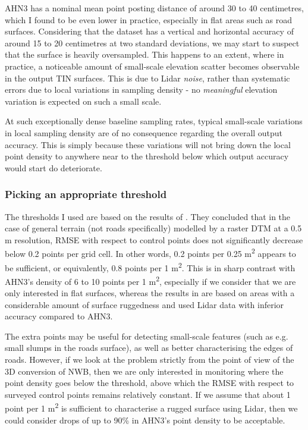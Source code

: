 AHN3 has a nominal mean point posting distance of around 30 to 40 centimetres, which I found to be even lower in practice, especially in flat areas such as road surfaces. Considering that the dataset has a vertical and horizontal accuracy of around 15 to 20 centimetres at two standard deviations, we may start to suspect that the surface is heavily oversampled. This happens to an extent, where in practice, a noticeable amount of small-scale elevation scatter becomes observable in the output TIN surfaces. This is due to Lidar \textit{noise}, rather than systematic errors due to local variations in sampling density - no \textit{meaningful} elevation variation is expected on such a small scale.

At such exceptionally dense baseline sampling rates, typical small-scale variations in local sampling density are of no consequence regarding the overall output accuracy. This is simply because these variations will not bring down the local point density to anywhere near to the threshold below which output accuracy would start do deteriorate. 

\subsubsection{Picking an appropriate threshold}

The thresholds I used are based on the results of \cite{guo_etal_2010}. They concluded that in the case of general terrain (not roads specifically) modelled by a raster DTM at a 0.5 m resolution, RMSE with respect to control points does not significantly decrease below 0.2 points per grid cell. In other words, 0.2 points per 0.25 m\textsuperscript{2} appears to be sufficient, or equivalently, 0.8 points per 1 m\textsuperscript{2}. This is in sharp contrast with AHN3's density of 6 to 10 points per 1 m\textsuperscript{2}, especially if we consider that we are only interested in flat surfaces, whereas the results in \cite{guo_etal_2010} are based on areas with a considerable amount of surface ruggedness and used Lidar data with inferior accuracy compared to AHN3.

The extra points may be useful for detecting small-scale features (such as e.g. small slumps in the roads surface), as well as better characterising the edges of roads. However, if we look at the problem strictly from the point of view of the 3D conversion of NWB, then we are only interested in monitoring where the point density goes below the threshold, above which the RMSE with respect to surveyed control points remains relatively constant. If we assume that about 1 point per 1 m\textsuperscript{2} is sufficient to characterise a rugged surface using Lidar, then we could consider drops of up to 90\% in AHN3's point density to be acceptable.

